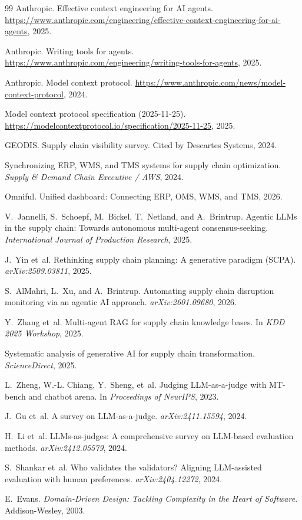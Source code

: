 \begin{thebibliography}{99}
Anthropic. Effective context engineering for AI agents. \url{https://www.anthropic.com/engineering/effective-context-engineering-for-ai-agents}, 2025.

Anthropic. Writing tools for agents. \url{https://www.anthropic.com/engineering/writing-tools-for-agents}, 2025.

Anthropic. Model context protocol. \url{https://www.anthropic.com/news/model-context-protocol}, 2024.

Model context protocol specification (2025-11-25). \url{https://modelcontextprotocol.io/specification/2025-11-25}, 2025.

GEODIS. Supply chain visibility survey. Cited by Descartes Systems, 2024.

Synchronizing ERP, WMS, and TMS systems for supply chain optimization. \emph{Supply \& Demand Chain Executive / AWS}, 2024.

Omniful. Unified dashboard: Connecting ERP, OMS, WMS, and TMS, 2026.

V.~Jannelli, S.~Schoepf, M.~Bickel, T.~Netland, and A.~Brintrup. Agentic LLMs in the supply chain: Towards autonomous multi-agent consensus-seeking. \emph{International Journal of Production Research}, 2025.

J.~Yin et~al. Rethinking supply chain planning: A generative paradigm (SCPA). \emph{arXiv:2509.03811}, 2025.

S.~AlMahri, L.~Xu, and A.~Brintrup. Automating supply chain disruption monitoring via an agentic AI approach. \emph{arXiv:2601.09680}, 2026.

Y.~Zhang et~al. Multi-agent RAG for supply chain knowledge bases. In \emph{KDD 2025 Workshop}, 2025.

Systematic analysis of generative AI for supply chain transformation. \emph{ScienceDirect}, 2025.

L.~Zheng, W.-L. Chiang, Y.~Sheng, et~al. Judging LLM-as-a-judge with MT-bench and chatbot arena. In \emph{Proceedings of NeurIPS}, 2023.

J.~Gu et~al. A survey on LLM-as-a-judge. \emph{arXiv:2411.15594}, 2024.

H.~Li et~al. LLMs-as-judges: A comprehensive survey on LLM-based evaluation methods. \emph{arXiv:2412.05579}, 2024.

S.~Shankar et~al. Who validates the validators? Aligning LLM-assisted evaluation with human preferences. \emph{arXiv:2404.12272}, 2024.

E.~Evans. \emph{Domain-Driven Design: Tackling Complexity in the Heart of Software}. Addison-Wesley, 2003.

\end{thebibliography}

